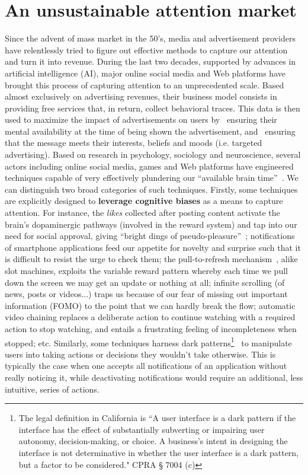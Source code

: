 \documentclass[10pt]{article}
\newcommand*\circled[1]{\tikz[baseline=(char.base)]{\footnotesize
    \node[shape=circle,draw,fill=black,text=white,inner sep=1pt] (char) {#1};}}
\begin{document}
\section{An unsustainable attention market}
Since the advent of mass market in the 50's, media and advertisement providers have relentlessly tried to figure out effective methods to capture our attention and turn it into revenue.
%
During the last two decades, supported by advances in artificial intelligence (AI), major online social media and Web platforms have brought this process of capturing attention to an unprecedented scale.
Based almost exclusively on advertising revenues, their business model consists in providing free services that, in return, collect behavioral traces. This data is then used to maximize the impact of advertisements on users by \circled{1}~ensuring their mental availability at the time of being shown the advertisement, and 
\circled{2}~ensuring that the message meets their interests, beliefs and moods (i.e. targeted advertising). 
Based on research in psychology, sociology and neuroscience, several actors including online social media, games and Web platforms have engineered techniques capable of very effectively plundering our ``available brain time''~\cite{lewis_our_2017,harris_how_2019}.
%
We can distinguish two broad categories of such techniques.
Firstly, some techniques are explicitly designed to \textbf{leverage cognitive biases} as a means to capture attention. 
For instance, the \textit{likes} collected after posting content activate the brain's dopaminergic pathways (involved in the reward system) and tap into our need for social approval, giving ``bright dings of pseudo-pleasure''~\cite{lewis_our_2017};
notifications of smartphone applications feed our appetite for novelty and surprise such that it is difficult to resist the urge to check them;
the pull-to-refresh mechanism~\cite{lewis_our_2017}, alike slot machines, exploits the variable reward pattern whereby each time we pull down the screen we may get an update or nothing at all;
infinite scrolling (of news, posts or videos...) traps us because of our fear of missing out important information (FOMO) to the point that we can hardly break the flow;
automatic video chaining replaces a deliberate action to continue watching with a required action to stop watching, and entails a frustrating feeling of incompleteness when stopped; etc.
Similarly, some techniques harness dark patterns\footnote{The legal definition in California is ``A user interface is a dark pattern if the interface has the effect of substantially subverting or impairing user autonomy, decision-making, or choice. A business’s intent in designing the interface is not determinative in whether the user interface is a dark pattern, but a factor to be considered." CPRA § 7004 (c)}~\cite{gray_mapping_2023} to manipulate users into taking actions or decisions they wouldn't take otherwise.
This is typically the case when one accepts all notifications of an application without really noticing it, while deactivating notifications would require an additional, less intuitive, series of actions.
\end{document}
